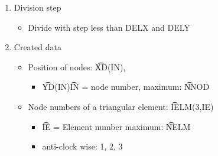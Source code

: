 \begin{enumerate}
\item
Division step
\begin{itemize}
\item
Divide with step less than DELX and DELY
\end{itemize}

\item
Created data
\begin{itemize}
\item
Position of nodes: \t{XD(IN)}, 
\begin{itemize}
\item
\t{YD(IN)}\t{IN} = node number, 
\quad maximum: \t{NNOD}
\end{itemize}

\item
Node numbers of a triangular element: \t{IELM(3,IE)}
\begin{itemize}
\item
\t{IE} = Element number
\quad maximum: \t{NELM}
\item
anti-clock wise: 1, 2, 3
\end{itemize}
\end{itemize}

\end{enumerate}

